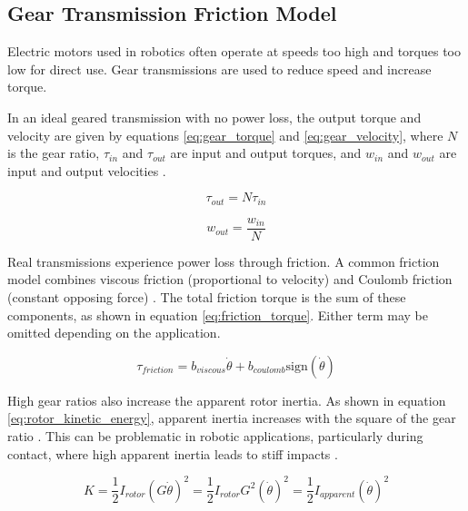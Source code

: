 \subsection{Gear Transmission Friction Model}
\label{sec:gear_transmission_friction_model}

    Electric motors used in robotics often operate at speeds too high and torques too low for direct use. Gear transmissions are used to reduce speed and increase torque.

    In an ideal geared transmission with no power loss, the output torque and velocity are given by equations \ref{eq:gear_torque} and \ref{eq:gear_velocity}, where $N$ is the gear ratio, $\tau_{in}$ and $\tau_{out}$ are input and output torques, and $w_{in}$ and $w_{out}$ are input and output velocities \cite{modern_robotics_book}.

    \begin{equation}
        \label{eq:gear_torque}
        \tau_{out} = N \tau_{in}
    \end{equation}

    \begin{equation}
        \label{eq:gear_velocity}
        w_{out} = \frac{w_{in}}{N}
    \end{equation}

    Real transmissions experience power loss through friction. A common friction model combines viscous friction (proportional to velocity) and Coulomb friction (constant opposing force) \cite{modern_robotics_book}. The total friction torque is the sum of these components, as shown in equation \ref{eq:friction_torque}. Either term may be omitted depending on the application.

    \begin{equation}
        \label{eq:friction_torque}
        \tau_{friction} = b_{viscous}\dot{\theta} + b_{coulomb}\text{sign}(\dot{\theta})  
    \end{equation}

    High gear ratios also increase the apparent rotor inertia. As shown in equation \ref{eq:rotor_kinetic_energy}, apparent inertia increases with the square of the gear ratio \cite{modern_robotics_book}. This can be problematic in robotic applications, particularly during contact, where high apparent inertia leads to stiff impacts \cite{proprioceptive}.

    \begin{equation}
        \label{eq:rotor_kinetic_energy}
        K = \frac{1}{2}{I}_{rotor}(G\dot\theta)^2 = \frac{1}{2}{I}_{rotor}G^2(\dot\theta)^2 = \frac{1}{2}I_{apparent}(\dot\theta)^2
    \end{equation}


